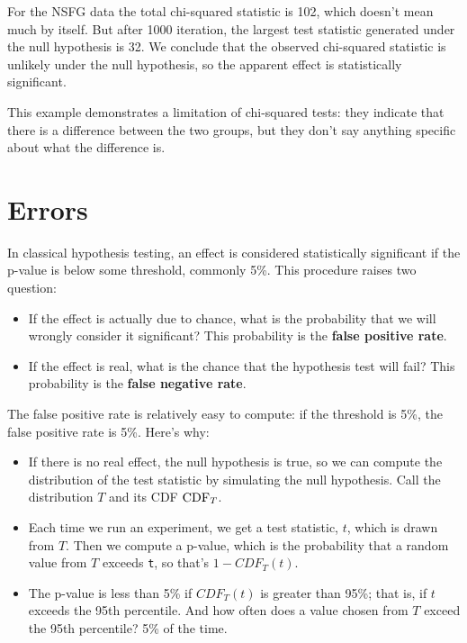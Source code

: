 \documentclass[12pt]{book}
\begin{document}
For the NSFG data the total chi-squared statistic is 102, which
doesn't mean much by itself.  But after 1000 iteration, the largest
test statistic generated under the null hypothesis is 32.  We conclude
that the observed chi-squared statistic is unlikely under the null
hypothesis, so the apparent effect is statistically significant.

This example demonstrates a limitation of chi-squared tests: they
indicate that there is a difference between the two groups,
but they don't say anything specific about what the difference is.


\section{Errors}

In classical hypothesis testing, an effect is considered statistically
significant if the p-value is below some threshold, commonly 5\%.
This procedure raises two question:

\begin{itemize}

\item If the effect is actually due to chance, what is the probability
that we will wrongly consider it significant?  This
probability is the {\bf false positive rate}.

\item If the effect is real, what is the chance that the hypothesis
test will fail?  This probability is the {\bf false negative rate}.

\end{itemize}

The false positive rate is relatively easy to compute: if the
threshold is 5\%, the false positive rate is 5\%.  Here's why:

\begin{itemize}

\item If there is no real effect, the null hypothesis is true, so we
  can compute the distribution of the test statistic by simulating the
  null hypothesis.  Call the distribution $T$ and its CDF $\mathrm{CDF}_T$.

\item Each time we run an experiment, we get a test statistic, $t$,
  which is drawn from $T$.  Then we compute a p-value, which is
  the probability that a random value from $T$ exceeds {\tt t},
  so that's $1 - CDF_T(t)$.

\item The p-value is less than 5\% if $CDF_T(t)$ is greater
  than 95\%; that is, if $t$ exceeds the 95th percentile.
  And how often does a value chosen from $T$ exceed
  the 95th percentile?  5\% of the time.

\end{itemize}
\end{document}
